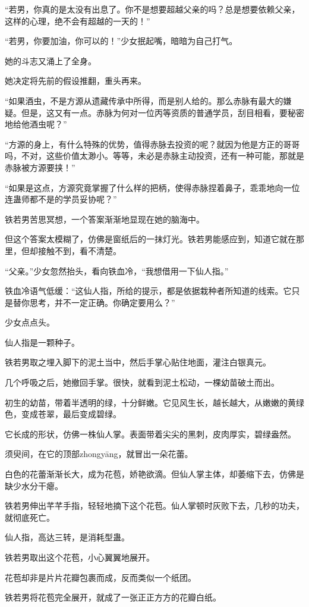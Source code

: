 \begin{this_body}
“若男，你真的是太没有出息了。你不是想要超越父亲的吗？总是想要依赖父亲，这样的心理，绝不会有超越的一天的！”

“若男，你要加油，你可以的！”少女抿起嘴，暗暗为自己打气。

她的斗志又涌上了全身。

她决定将先前的假设推翻，重头再来。

“如果酒虫，不是方源从遗藏传承中所得，而是别人给的。那么赤脉有最大的嫌疑。但是，这又有一点。赤脉为何对一位丙等资质的普通学员，刮目相看，要秘密地给他酒虫呢？”

“方源的身上，有什么特殊的优势，值得赤脉去投资的呢？就因为他是方正的哥哥吗，不对，这些价值太渺小。等等，未必是赤脉主动投资，还有一种可能，那就是赤脉被方源要挟！”

“如果是这点，方源究竟掌握了什么样的把柄，使得赤脉捏着鼻子，乖乖地向一位连蛊师都不是的学员妥协呢？”

铁若男苦思冥想，一个答案渐渐地显现在她的脑海中。

但这个答案太模糊了，仿佛是窗纸后的一抹灯光。铁若男能感应到，知道它就在那里，但却接触不到，看不清楚。

“父亲。”少女忽然抬头，看向铁血冷，“我想借用一下仙人指。”

铁血冷语气低缓：“这仙人指，所给的提示，都是依据栽种者所知道的线索。它只是替你思考，并不一定正确。你确定要用么？”

少女点点头。

仙人指是一颗种子。

铁若男取之埋入脚下的泥土当中，然后手掌心贴住地面，灌注白银真元。

几个呼吸之后，她撤回手掌。很快，就看到泥土松动，一棵幼苗破土而出。

初生的幼苗，带着半透明的绿，十分鲜嫩。它见风生长，越长越大，从嫩嫩的黄绿色，变成苍翠，最后变成碧绿。

它长成的形状，仿佛一株仙人掌。表面带着尖尖的黑刺，皮肉厚实，碧绿盎然。

须臾间，在它的顶部zhongyāng，就冒出一朵花蕾。

白色的花蕾渐渐长大，成为花苞，娇艳欲滴。但仙人掌主体，却萎缩下去，仿佛是缺少水分干瘪。

铁若男伸出芊芊手指，轻轻地摘下这个花苞。仙人掌顿时灰败下去，几秒的功夫，就彻底死亡。

仙人指，高达三转，是消耗型蛊。

铁若男取出这个花苞，小心翼翼地展开。

花苞却非是片片花瓣包裹而成，反而类似一个纸团。

铁若男将花苞完全展开，就成了一张正正方方的花瓣白纸。


\end{this_body}
